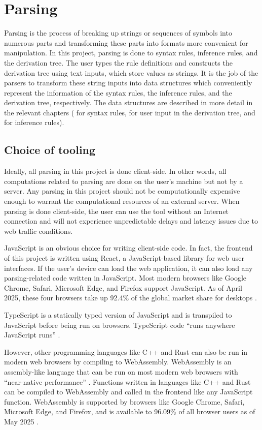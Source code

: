 \section{Parsing}
Parsing is the process of breaking up strings or sequences of symbols into numerous parts and transforming these parts into formats more convenient for manipulation. In this project, parsing is done to syntax rules, inference rules, and the derivation tree. The user types the rule definitions and constructs the derivation tree using text inputs, which store values as strings. It is the job of the parsers to transform these string inputs into data structures which conveniently represent the information of the syntax rules, the inference rules, and the derivation tree, respectively. The data structures are described in more detail in the relevant chapters ( for syntax rules,  for user input in the derivation tree, and  for inference rules).

\subsection{Choice of tooling}
Ideally, all parsing in this project is done client-side. In other words, all computations related to parsing are done on the user's machine but not by a server. Any parsing in this project should not be computationally expensive enough to warrant the computational resources of an external server. When parsing is done client-side, the user can use the tool without an Internet connection and will not experience unpredictable delays and latency issues due to web traffic conditions.

JavaScript is an obvious choice for writing client-side code. In fact, the frontend of this project is written using React, a JavaScript-based library for web user interfaces. If the user's device can load the web application, it can also load any parsing-related code written in JavaScript. Most modern browsers like Google Chrome, Safari, Microsoft Edge, and Firefox support JavaScript. As of April 2025, these four browsers take up 92.4\% of the global market share for desktops \cite{statcounter}.

TypeScript is a statically typed version of JavaScript and is transpiled to JavaScript before being run on browsers. TypeScript code ``runs anywhere JavaScript runs'' \cite{typescript}.

However, other programming languages like C++ and Rust can also be run in modern web browsers by compiling to WebAssembly. WebAssembly is an assembly-like language that can be run on most modern web browsers with ``near-native performance'' \cite{webassembly}. Functions written in languages like C++ and Rust can be compiled to WebAssembly and called in the frontend like any JavaScript function. WebAssembly is supported by browsers like Google Chrome, Safari, Microsoft Edge, and Firefox, and is available to 96.09\% of all browser users as of May 2025 \cite{webassembly:caniuse}.


